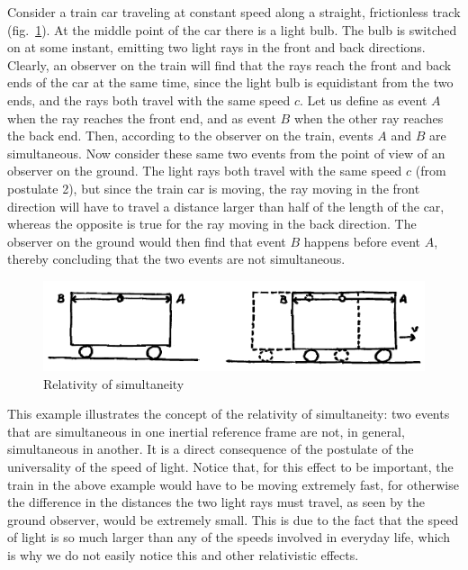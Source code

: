 Consider a train car traveling at constant speed along a straight, frictionless track (fig.\ \ref{fig:lec2_1}). At the middle point of the car there is a light bulb. The bulb is switched on at some instant, emitting two light rays in the front and back directions. Clearly, an observer on the train will find that the rays reach the front and back ends of the car at the same time, since the light bulb is equidistant from the two ends, and the rays both travel with the same speed $c$. Let us define as event $A$ when the ray reaches the front end, and as event $B$ when the other ray reaches the back end. Then, according to the observer on the train, events $A$ and $B$ are simultaneous. Now consider these same two events from the point of view of an observer on the ground. The light rays both travel with the same speed $c$ (from postulate 2), but since the train car is moving, the ray moving in the front direction will have to travel a distance larger than half of the length of the car, whereas the opposite is 
true for the ray moving in the back direction. The observer on the ground would then find that event $B$ happens before event $A$, thereby concluding that the two events are not simultaneous.
\begin{figure}[ht]
\begin{center}
\includegraphics[scale=0.5]{Draw/lec2_1.png}
\end{center}
\caption{Relativity of simultaneity}
\label{fig:lec2_1}
\end{figure}

This example illustrates the concept of the relativity of simultaneity: two events that are simultaneous in one inertial reference frame are not, in general, simultaneous in another. It is a direct consequence of the postulate of the universality of the speed of light. Notice that, for this effect to be important, the train in the above example would have to be moving extremely fast, for otherwise the difference in the distances the two light rays must travel, as seen by the ground observer, would be extremely small. This is due to the fact that the speed of light is so much larger than any of the speeds involved in everyday life, which is why we do not easily notice this and other relativistic effects.

